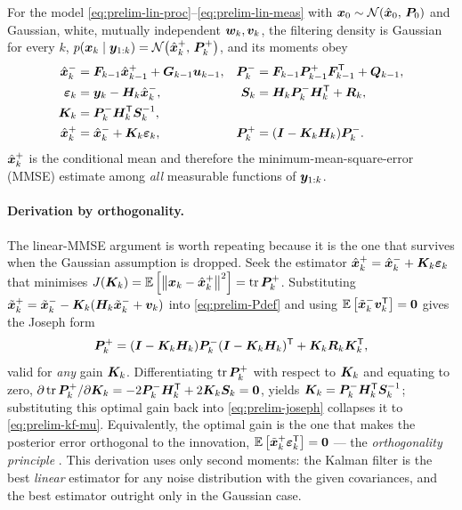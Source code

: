 \begin{theorem}\label{thm:prelim-kf}
For the model \eqref{eq:prelim-lin-proc}--\eqref{eq:prelim-lin-meas} with
$\bm{x}_0\sim\mathcal{N}\!\left(\hat{\bm{x}}_0,\,\bm{P}_0\right)$ and Gaussian, white, mutually independent $\bm{w}_k,\bm{v}_k$, the
filtering density is Gaussian for every $k$, $p(\bm{x}_k\mid\bm{y}_{1:k}) = \mathcal{N}\!\left(\hat{\bm{x}}^{+}_k,\,\bm{P}^{+}_k\right)$,
and its moments obey
\begin{align}
\hat{\bm{x}}^{-}_k &= \bm{F}_{k-1}\hat{\bm{x}}^{+}_{k-1} + \bm{G}_{k-1}\bm{u}_{k-1}, &
\bm{P}^{-}_k &= \bm{F}_{k-1}\bm{P}^{+}_{k-1}\bm{F}_{k-1}^{\mathsf{T}} + \bm{Q}_{k-1},
  \label{eq:prelim-kf-tu}\\
\bm{\varepsilon}_k &= \bm{y}_k - \bm{H}_k\hat{\bm{x}}^{-}_k, &
\bm{S}_k &= \bm{H}_k\bm{P}^{-}_k\bm{H}_k^{\mathsf{T}} + \bm{R}_k, \label{eq:prelim-kf-innov}\\
\bm{K}_k &= \bm{P}^{-}_k\bm{H}_k^{\mathsf{T}}\bm{S}_k^{-1}, &&\notag\\
\hat{\bm{x}}^{+}_k &= \hat{\bm{x}}^{-}_k + \bm{K}_k\bm{\varepsilon}_k, &
\bm{P}^{+}_k &= (\bm{I} - \bm{K}_k\bm{H}_k)\bm{P}^{-}_k. \label{eq:prelim-kf-mu}
\end{align}
$\hat{\bm{x}}^{+}_k$ is the conditional mean and therefore the minimum-mean-square-error (MMSE) estimate
among \emph{all} measurable functions of $\bm{y}_{1:k}$.
\end{theorem}

\paragraph{Derivation by orthogonality.} The linear-MMSE argument is worth repeating because it
is the one that survives when the Gaussian assumption is dropped. Seek the estimator
$\hat{\bm{x}}^{+}_k = \hat{\bm{x}}^{-}_k + \bm{K}_k\bm{\varepsilon}_k$ that minimises
$J(\bm{K}_k) = \mathbb{E}\left[\left\lVert \bm{x}_k-\hat{\bm{x}}^{+}_k \right\rVert^2\right] = \operatorname{tr}\bm{P}^{+}_k$. Substituting
$\tilde{\bm{x}}^+_k = \tilde{\bm{x}}^-_k - \bm{K}_k(\bm{H}_k\tilde{\bm{x}}^-_k + \bm{v}_k)$ into
\eqref{eq:prelim-Pdef} and using $\mathbb{E}\left[\tilde{\bm{x}}^-_k\bm{v}_k^{\mathsf{T}}\right]=\bm 0$ gives the Joseph form
\begin{equation}
\bm{P}^{+}_k = (\bm{I}-\bm{K}_k\bm{H}_k)\bm{P}^{-}_k(\bm{I}-\bm{K}_k\bm{H}_k)^{\mathsf{T}} + \bm{K}_k\bm{R}_k\bm{K}_k^{\mathsf{T}},
\label{eq:prelim-joseph}
\end{equation}
valid for \emph{any} gain $\bm{K}_k$. Differentiating $\operatorname{tr}\bm{P}^{+}_k$ with respect to $\bm{K}_k$ and
equating to zero,
$\partial \operatorname{tr}\bm{P}^{+}_k/\partial\bm{K}_k = -2\bm{P}^{-}_k\bm{H}_k^{\mathsf{T}} + 2\bm{K}_k\bm{S}_k = \bm0$, yields
$\bm{K}_k = \bm{P}^{-}_k\bm{H}_k^{\mathsf{T}}\bm{S}_k^{-1}$; substituting this optimal gain back into
\eqref{eq:prelim-joseph} collapses it to \eqref{eq:prelim-kf-mu}. Equivalently, the optimal gain
is the one that makes the posterior error orthogonal to the innovation,
$\mathbb{E}\left[\tilde{\bm{x}}^+_k\bm{\varepsilon}_k^{\mathsf{T}}\right]=\bm 0$ --- the \emph{orthogonality principle}
\cite{kailath2000}. This derivation uses only second moments: the Kalman filter is the best
\emph{linear} estimator for any noise distribution with the given covariances, and the best
estimator outright only in the Gaussian case.


